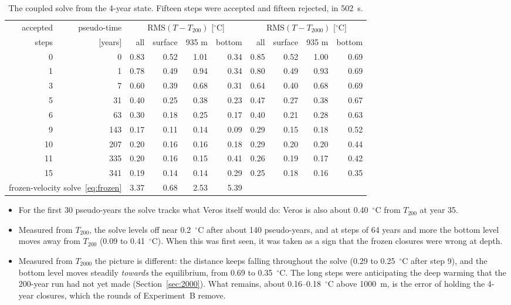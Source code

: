 \documentclass{article}
\begin{document}
\begin{table}[h]
\centering
\small
\setlength{\tabcolsep}{4pt}
\renewcommand{\arraystretch}{1.2}
\begin{tabular}{r|r|rrrr|rrrr}
\toprule
accepted & pseudo-time & \multicolumn{4}{c|}{RMS$(T-T_{200})$ [$^\circ$C]} & \multicolumn{4}{c}{RMS$(T-T_{2000})$ [$^\circ$C]} \\
\cmidrule{3-6}\cmidrule{7-10}
steps & [years] & all & surface & 935 m & bottom & all & surface & 935 m & bottom \\
\midrule
0 & 0 & 0.83 & 0.52 & 1.01 & 0.34 & 0.85 & 0.52 & 1.00 & 0.69 \\
1 & 1 & 0.78 & 0.49 & 0.94 & 0.34 & 0.80 & 0.49 & 0.93 & 0.69 \\
3 & 7 & 0.60 & 0.39 & 0.68 & 0.31 & 0.64 & 0.40 & 0.68 & 0.69 \\
5 & 31 & 0.40 & 0.25 & 0.38 & 0.23 & 0.47 & 0.27 & 0.38 & 0.67 \\
6 & 63 & 0.30 & 0.18 & 0.25 & 0.17 & 0.40 & 0.21 & 0.28 & 0.63 \\
9 & 143 & 0.17 & 0.11 & 0.14 & 0.09 & 0.29 & 0.15 & 0.18 & 0.52 \\
10 & 207 & 0.20 & 0.16 & 0.16 & 0.18 & 0.29 & 0.20 & 0.20 & 0.44 \\
11 & 335 & 0.20 & 0.16 & 0.15 & 0.41 & 0.26 & 0.19 & 0.17 & 0.42 \\
15 & 341 & 0.19 & 0.14 & 0.14 & 0.29 & 0.25 & 0.18 & 0.16 & 0.35 \\
\midrule
\multicolumn{2}{l|}{frozen-velocity solve~\eqref{eq:frozen}} & 3.37 & 0.68 & 2.53 & 5.39 & & & & \\
\bottomrule
\end{tabular}
\caption{The coupled solve from the 4-year state. Fifteen steps were accepted and fifteen rejected, in 502~s.}
\label{tab:exp4solve}
\end{table}

\begin{itemize}
\item For the first 30 pseudo-years the solve tracks what Veros itself would do: Veros is also about 0.40~$^\circ$C from $T_{200}$ at year 35.
\item Measured from $T_{200}$, the solve levels off near 0.2~$^\circ$C after about 140 pseudo-years, and at steps of 64 years and more the bottom level moves away from $T_{200}$ (0.09 to 0.41~$^\circ$C). When this was first seen, it was taken as a sign that the frozen closures were wrong at depth.
\item Measured from $T_{2000}$ the picture is different: the distance keeps falling throughout the solve (0.29 to 0.25~$^\circ$C after step 9), and the bottom level moves steadily \emph{towards} the equilibrium, from 0.69 to 0.35~$^\circ$C. The long steps were anticipating the deep warming that the 200-year run had not yet made (Section~\ref{sec:2000}). What remains, about 0.16--0.18~$^\circ$C above 1000~m, is the error of holding the 4-year closures, which the rounds of Experiment~B remove.
\end{itemize}
\end{document}
